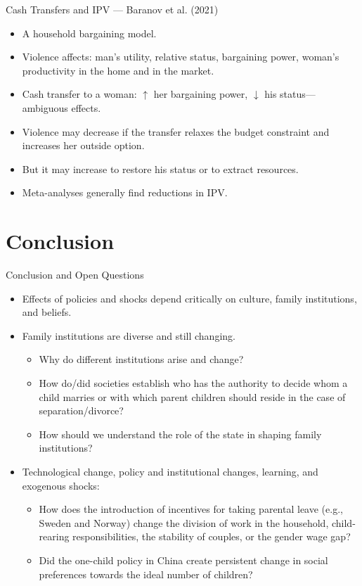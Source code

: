 \documentclass[11pt,notes=hide,aspectratio=169,mathserif]{beamer}
\begin{document}
\begin{frame}{Cash Transfers and IPV — Baranov et al. (2021)}
\begin{itemize}
  \item A household bargaining model.
  \item Violence affects: man's utility, relative status, bargaining power, woman's productivity in the home and in the market.
  \item Cash transfer to a woman: $\uparrow$ her bargaining power, $\downarrow$ his status—ambiguous effects.
  \item Violence may decrease if the transfer relaxes the budget constraint and increases her outside option.
  \item But it may increase to restore his status or to extract resources.
  \item Meta-analyses generally find reductions in IPV.
\end{itemize}
\end{frame}

\section{Conclusion}
\begin{frame}{Conclusion and Open Questions}
\begin{itemize}
  \item Effects of policies and shocks depend critically on culture, family institutions, and beliefs.
  \item Family institutions are diverse and still changing.
  \begin{itemize}
    \item Why do different institutions arise and change?
    \item How do/did societies establish who has the authority to decide whom a child marries or with which parent children should reside in the case of separation/divorce?
    \item How should we understand the role of the state in shaping family institutions?
  \end{itemize}
  \item Technological change, policy and institutional changes, learning, and exogenous shocks:
  \begin{itemize}
    \item How does the introduction of incentives for taking parental leave (e.g., Sweden and Norway) change the division of work in the household, child-rearing responsibilities, the stability of couples, or the gender wage gap?
    \item Did the one-child policy in China create persistent change in social preferences towards the ideal number of children?
  \end{itemize}
\end{itemize}
\end{frame}
\end{document}
